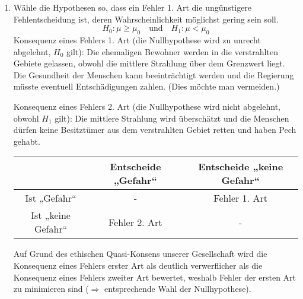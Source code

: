 \documentclass[a4paper]{scrartcl}
\def \blattnr {9}
\begin{document}
\begin{enumerate}[label=\bfseries \blattnr.\arabic*]
    \item 
        Wähle die Hypothesen so, dass ein Fehler 1. Art die ungünstigere
        Fehlentscheidung ist, deren Wahrscheinlichkeit möglichst gering sein
        soll.
        \begin{equation*}
            H_0 \colon \mu \geq \mu_0
            \quad \text{und} \quad
            H_1 \colon \mu < \mu_0
        \end{equation*}
        Konsequenz eines Fehlers 1. Art (die Nullhypothese wird zu unrecht
        abgelehnt, $H_0$ gilt):
        Die ehemaligen Bewohner werden in die verstrahlten Gebiete gelassen,
        obwohl die mittlere Strahlung über dem Grenzwert liegt. Die Gesundheit
        der Menschen kann beeinträchtigt werden und die Regierung müsste
        eventuell Entschädigungen zahlen. (Dies möchte man vermeiden.)

        Konsequenz eines Fehlers 2. Art (die Nullhypothese wird nicht abgelehnt,
        obwohl $H_1$ gilt):
        Die mittlere Strahlung wird überschätzt und die Menschen dürfen keine
        Besitztümer aus dem verstrahlten Gebiet retten und haben Pech gehabt.
        
        \begin{tabular}{c|c|c}
            & Entscheide „Gefahr“ & Entscheide „keine Gefahr“ \\
            \hline
            Ist „Gefahr“           & -             & Fehler 1. Art \\
            Ist „keine Gefahr“     & Fehler 2. Art & - 
        \end{tabular}
        
        Auf Grund des ethischen Quasi-Konsens unserer Gesellschaft wird die
        Konsequenz eines Fehlers erster Art als deutlich verwerflicher als die
        Konsequenz eines Fehlers zweiter Art bewertet, weshalb Fehler der
        ersten Art zu minimieren sind ($\Rightarrow$ entsprechende Wahl der
        Nullhypothese).
    

\end{enumerate}
\end{document}
